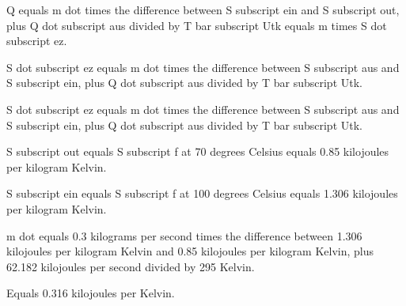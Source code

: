 Q equals m dot times the difference between S subscript ein and S subscript out, plus Q dot subscript aus divided by T bar subscript Utk equals m times S dot subscript ez.

S dot subscript ez equals m dot times the difference between S subscript aus and S subscript ein, plus Q dot subscript aus divided by T bar subscript Utk.

S dot subscript ez equals m dot times the difference between S subscript aus and S subscript ein, plus Q dot subscript aus divided by T bar subscript Utk.

S subscript out equals S subscript f at 70 degrees Celsius equals 0.85 kilojoules per kilogram Kelvin.

S subscript ein equals S subscript f at 100 degrees Celsius equals 1.306 kilojoules per kilogram Kelvin.

m dot equals 0.3 kilograms per second times the difference between 1.306 kilojoules per kilogram Kelvin and 0.85 kilojoules per kilogram Kelvin, plus 62.182 kilojoules per second divided by 295 Kelvin.

Equals 0.316 kilojoules per Kelvin.